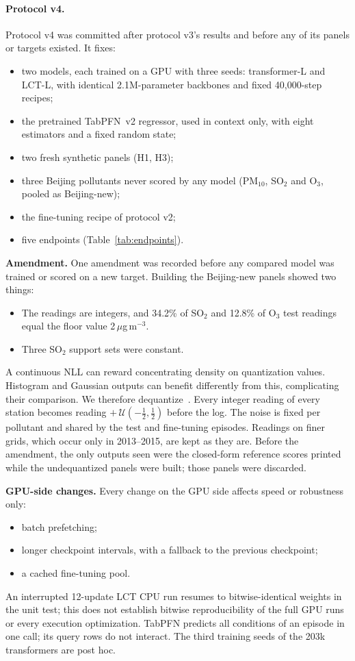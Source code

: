 \paragraph{Protocol v4.}
Protocol v4 was committed after protocol v3's results and before any of its panels or targets existed. It fixes:
\begin{itemize}
  \item two models, each trained on a GPU with three seeds: transformer-L and LCT-L, with identical 2.1M-parameter
  backbones and fixed 40,000-step recipes;
  \item the pretrained TabPFN~v2 regressor, used in context only, with eight estimators and a fixed random state;
  \item two fresh synthetic panels (H1, H3);
  \item three Beijing pollutants never scored by any model (PM$_{10}$, SO$_2$ and O$_3$, pooled as Beijing-new);
  \item the fine-tuning recipe of protocol v2;
  \item five endpoints (Table~\ref{tab:endpoints}).
\end{itemize}

\textbf{Amendment.} One amendment was recorded before any compared model was trained or scored on a new target.
Building the Beijing-new panels showed two things:
\begin{itemize}
  \item The readings are integers, and 34.2\% of SO$_2$ and 12.8\% of O$_3$ test readings equal the floor value
  2\,$\mu$g\,m$^{-3}$.
  \item Three SO$_2$ support sets were constant.
\end{itemize}
A continuous NLL can reward concentrating density on quantization values. Histogram and Gaussian outputs can
benefit differently from this, complicating their comparison. We therefore dequantize~\citep{theis2016note}.
Every integer reading of every station becomes reading
$+\,\mathcal{U}(-\tfrac12,\tfrac12)$ before the log. The noise is fixed per pollutant and shared by the test and
fine-tuning episodes. Readings on finer grids, which occur only in 2013--2015, are kept as they are. Before the
amendment, the only outputs seen were the closed-form reference scores printed while the undequantized panels were
built; those panels were discarded.

\textbf{GPU-side changes.} Every change on the GPU side affects speed or robustness only:
\begin{itemize}
  \item batch prefetching;
  \item longer checkpoint intervals, with a fallback to the previous checkpoint;
  \item a cached fine-tuning pool.
\end{itemize}
An interrupted 12-update LCT CPU run resumes to bitwise-identical weights in the unit test; this does not establish
bitwise reproducibility of the full GPU runs or every execution optimization. TabPFN predicts all conditions of an
episode in one call; its query rows do not interact. The third training seeds of the 203k transformers are post hoc.

